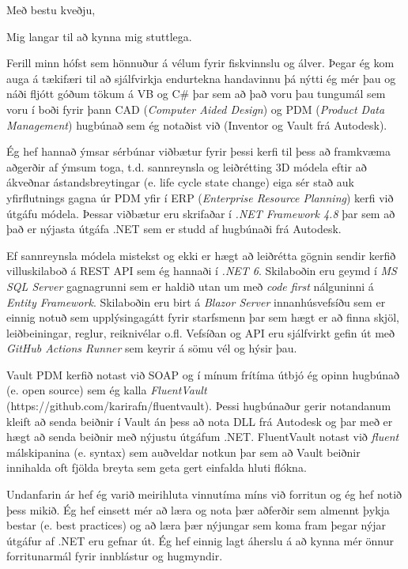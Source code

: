 \documentclass[11pt,a4paper,sans]{moderncv}
\begin{document}
{
    \fancyfoot[r]{}
    \setcounter{page}{0}
    \date{\today}
    \closing{Með bestu kveðju,}
    
    \makelettertitle

    Mig langar til að kynna mig stuttlega.

    Ferill minn hófst sem hönnuður á vélum fyrir fiskvinnslu og álver. Þegar ég kom auga á tækifæri til að sjálfvirkja endurtekna handavinnu þá nýtti ég mér þau og náði fljótt góðum tökum á VB og C\# þar sem að það voru þau tungumál sem voru í boði fyrir þann CAD (\emph{Computer Aided Design}) og PDM (\emph{Product Data Management}) hugbúnað sem ég notaðist við (Inventor og Vault frá Autodesk).

    Ég hef hannað ýmsar sérbúnar viðbætur fyrir þessi kerfi til þess að framkvæma aðgerðir af ýmsum toga, t.d. sannreynsla og leiðrétting 3D módela eftir að ákveðnar ástandsbreytingar (e. life cycle state change) eiga sér stað auk yfirflutnings gagna úr PDM yfir í ERP (\emph{Enterprise Resource Planning}) kerfi við útgáfu módela. Þessar viðbætur eru skrifaðar í \emph{.NET Framework 4.8} þar sem að það er nýjasta útgáfa .NET sem er studd af hugbúnaði frá Autodesk.
    
    Ef sannreynsla módela mistekst og ekki er hægt að leiðrétta gögnin sendir kerfið villuskilaboð á REST API sem ég hannaði í \emph{.NET 6}. Skilaboðin eru geymd í \emph{MS SQL Server} gagnagrunni sem er haldið utan um með \emph{code first} nálguninni á \emph{Entity Framework}. Skilaboðin eru birt á \emph{Blazor Server} innanhúsvefsíðu sem er einnig notuð sem upplýsingagátt fyrir starfsmenn þar sem hægt er að finna skjöl, leiðbeiningar, reglur, reiknivélar o.fl. Vefsíðan og API eru sjálfvirkt gefin út með \emph{GitHub Actions Runner} sem keyrir á sömu vél og hýsir þau.

    Vault PDM kerfið notast við SOAP og í mínum frítíma útbjó ég opinn hugbúnað (e. open source) sem ég kalla \emph{FluentVault} (https://github.com/karirafn/fluentvault). Þessi hugbúnaður gerir notandanum kleift að senda beiðnir í Vault án þess að nota DLL frá Autodesk og þar með er hægt að senda beiðnir með nýjustu útgáfum .NET. FluentVault notast við \emph{fluent} málskipanina (e. syntax) sem auðveldar notkun þar sem að Vault beiðnir innihalda oft fjölda breyta sem geta gert einfalda hluti flókna.

    Undanfarin ár hef ég varið meirihluta vinnutíma míns við forritun og ég hef notið þess mikið. Ég hef einsett mér að læra og nota þær aðferðir sem almennt þykja bestar (e. best practices) og að læra þær nýjungar sem koma fram þegar nýjar útgáfur af .NET eru gefnar út. Ég hef einnig lagt áherslu á að kynna mér önnur forritunarmál fyrir innblástur og hugmyndir.

}
\end{document}
